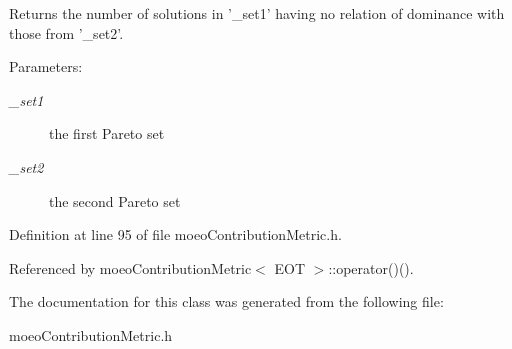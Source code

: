 Returns the number of solutions in '\_\-set1' having no relation of dominance with those from '\_\-set2'. 

\begin{Desc}
\item[Parameters:]
\begin{description}
\item[{\em \_\-set1}]the first Pareto set \item[{\em \_\-set2}]the second Pareto set \end{description}
\end{Desc}


Definition at line 95 of file moeo\-Contribution\-Metric.h.

Referenced by moeo\-Contribution\-Metric$<$ EOT $>$::operator()().

The documentation for this class was generated from the following file:\begin{CompactItemize}
\item 
moeo\-Contribution\-Metric.h\end{CompactItemize}
